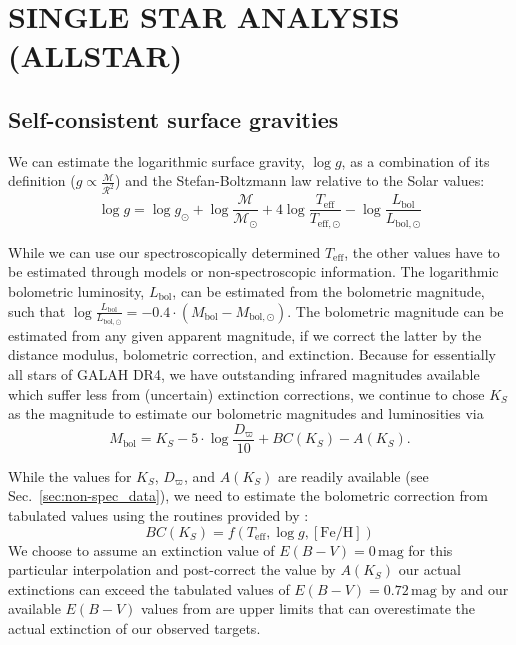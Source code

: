 \documentclass[
  journal=pasa,
  manuscript=research-paper, %
  year=2023,
  volume=37
]{cup-journal}
\begin{document}
\newpage
\section{SINGLE STAR ANALYSIS (ALLSTAR)}
\label{sec:allstar_analysis}


\subsection{Self-consistent surface gravities}

We can estimate the logarithmic surface gravity, $\log g$, as a combination of its definition ($g \propto \frac{\mathcal{M}}{\mathcal{R}^2}$) and the Stefan-Boltzmann law relative to the Solar values:
\begin{equation}
\log g = \log g_\odot + \log \frac{\mathcal{M}}{\mathcal{M_\odot}} + 4 \log \frac{T_\mathrm{eff}}{T_\mathrm{eff,\odot}} - \log \frac{L_\mathrm{bol}}{L_\mathrm{bol,\odot}} \label{eq:logg}
\end{equation}

While we can use our spectroscopically determined $T_\mathrm{eff}$, the other values have to be estimated through models or non-spectroscopic information. The logarithmic bolometric luminosity, $L_\mathrm{bol}$, can be estimated from the bolometric magnitude, such that $\log \frac{L_\mathrm{bol}}{L_\mathrm{bol,\odot}} = -0.4 \cdot \left(M_\mathrm{bol} - M_\mathrm{bol,\odot} \right)$. The bolometric magnitude can be estimated from any given apparent magnitude, if we correct the latter by the distance modulus, bolometric correction, and extinction. Because for essentially all stars of GALAH DR4, we have outstanding infrared magnitudes available which suffer less from (uncertain) extinction corrections, we continue to chose $K_S$ as the magnitude to estimate our bolometric magnitudes and luminosities via
\begin{equation}
M_\mathrm{bol} = K_S - 5\cdot \log \frac{D_\varpi}{10} + BC(K_S) - A(K_S). \label{eq:mbol}
\end{equation}

While the values for $K_S$, $D_\varpi$, and $A(K_S)$ are readily available (see Sec.~\ref{sec:non-spec_data}), we need to estimate the bolometric correction from tabulated values using the routines provided by \citet{Casagrande2018}:
\begin{equation}
BC(K_S) = f(T_\mathrm{eff}, \log g, \mathrm{[Fe/H]})
\label{eq:bc_ks}
\end{equation}
We choose to assume an extinction value of $E(B-V) = 0\,\mathrm{mag}$ for this particular interpolation and post-correct the value by $A(K_S)$ our actual extinctions can exceed the tabulated values of $E(B-V) = 0.72\,\mathrm{mag}$ by \citet{Casagrande2018} and our available $E(B-V)$ values from \citet{Schlegel1998} are upper limits that can overestimate the actual extinction of our observed targets.
\end{document}
